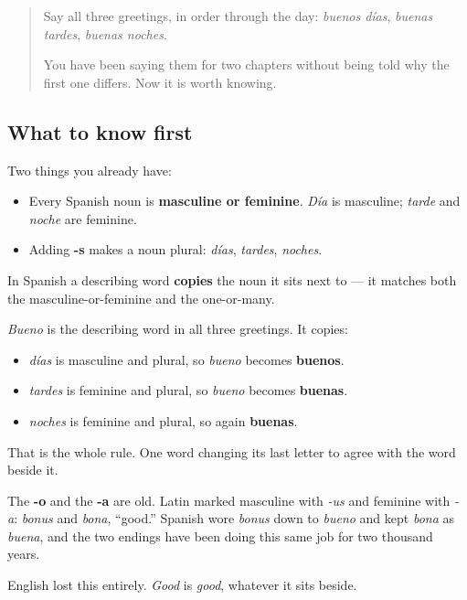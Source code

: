 \begin{quote}
Say all three greetings, in order through the day: \emph{buenos días}, \emph{buenas tardes}, \emph{buenas noches}.

You have been saying them for two chapters without being told why the first one differs. Now it is worth knowing.
\end{quote}

\subsection*{What to know first}
Two things you already have:

\begin{itemize}
\raggedright
  \item Every Spanish noun is \textbf{masculine or feminine}. \emph{Día} is masculine; \emph{tarde} and \emph{noche} are feminine.
  \item Adding \textbf{-s} makes a noun plural: \emph{días}, \emph{tardes}, \emph{noches}.
\end{itemize}

\begin{grammarlens}[title={Grammar Lens: the describing word copies the noun}]
In Spanish a describing word \textbf{copies} the noun it sits next to — it matches both the masculine-or-feminine and the one-or-many.

\emph{Bueno} is the describing word in all three greetings. It copies:

\begin{itemize}
\raggedright
  \item \emph{días} is masculine and plural, so \emph{bueno} becomes \textbf{buenos}.
  \item \emph{tardes} is feminine and plural, so \emph{bueno} becomes \textbf{buenas}.
  \item \emph{noches} is feminine and plural, so again \textbf{buenas}.
\end{itemize}

That is the whole rule. One word changing its last letter to agree with the word beside it.
\end{grammarlens}

\begin{cousinweb}
The \textbf{-o} and the \textbf{-a} are old. Latin marked masculine with \emph{-us} and feminine with \emph{-a}: \emph{bonus} and \emph{bona}, \textquotedblleft{}good.\textquotedblright{} Spanish wore \emph{bonus} down to \emph{bueno} and kept \emph{bona} as \emph{buena}, and the two endings have been doing this same job for two thousand years.

English lost this entirely. \emph{Good} is \emph{good}, whatever it sits beside.
\end{cousinweb}

